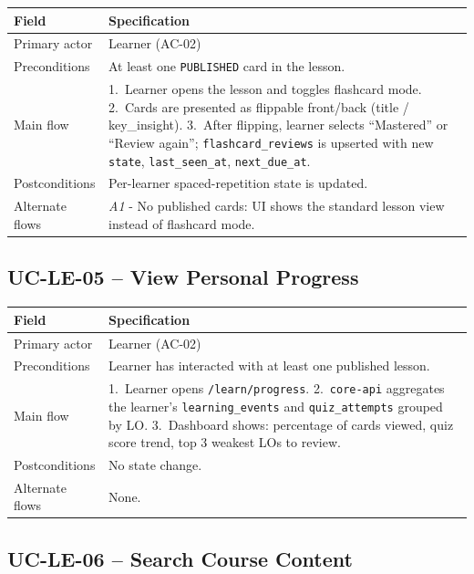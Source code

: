 \begin{longtable}{|p{3.2cm}|p{10.3cm}|}
\hline
\textbf{Field} & \textbf{Specification} \\
\hline
\endhead
Primary actor & Learner (AC-02) \\
\hline
Preconditions & At least one \texttt{PUBLISHED} card in the lesson. \\
\hline
Main flow &
    1.\ Learner opens the lesson and toggles flashcard mode.
    2.\ Cards are presented as flippable front/back (title /
    key\_insight).
    3.\ After flipping, learner selects ``Mastered'' or ``Review
    again''; \texttt{flashcard\_reviews} is upserted with new
    \texttt{state}, \texttt{last\_seen\_at},
    \texttt{next\_due\_at}. \\
\hline
Postconditions & Per-learner spaced-repetition state is updated. \\
\hline
Alternate flows &
    \emph{A1} - No published cards: UI shows the standard lesson view
    instead of flashcard mode. \\
\hline
\end{longtable}

\subsection{UC-LE-05 -- View Personal Progress}

\begin{longtable}{|p{3.2cm}|p{10.3cm}|}
\hline
\textbf{Field} & \textbf{Specification} \\
\hline
\endhead
Primary actor & Learner (AC-02) \\
\hline
Preconditions & Learner has interacted with at least one published
    lesson. \\
\hline
Main flow &
    1.\ Learner opens \texttt{/learn/progress}.
    2.\ \texttt{core-api} aggregates the learner's
    \texttt{learning\_events} and \texttt{quiz\_attempts} grouped by
    LO.
    3.\ Dashboard shows: percentage of cards viewed, quiz score
    trend, top 3 weakest LOs to review. \\
\hline
Postconditions & No state change. \\
\hline
Alternate flows & None. \\
\hline
\end{longtable}

\subsection{UC-LE-06 -- Search Course Content}

